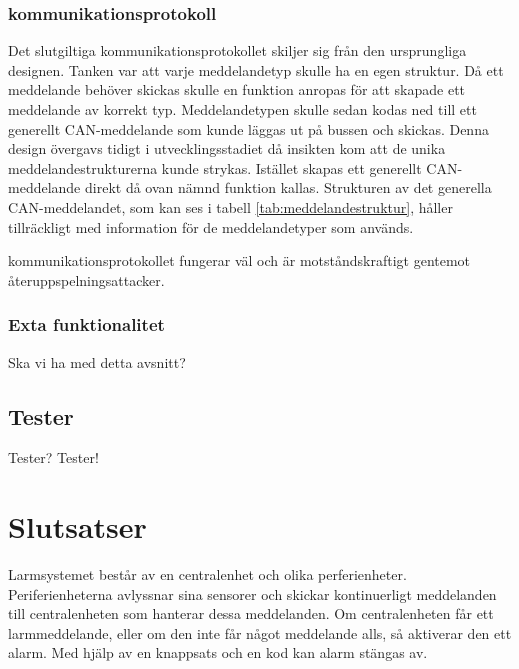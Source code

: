 \documentclass[a4paper]{article}
\begin{document}
\subsubsection{kommunikationsprotokoll}
Det slutgiltiga kommunikationsprotokollet skiljer sig från den ursprungliga designen.
Tanken var att varje meddelandetyp skulle ha en egen struktur.
Då ett meddelande behöver skickas skulle en funktion anropas för att skapade ett meddelande av korrekt typ.
Meddelandetypen skulle sedan kodas ned till ett generellt CAN-meddelande som kunde läggas ut på bussen och skickas.
Denna design övergavs tidigt i utvecklingsstadiet då insikten kom att de unika meddelandestrukturerna kunde strykas.
Istället skapas ett generellt CAN-meddelande direkt då ovan nämnd funktion kallas.
Strukturen av det generella CAN-meddelandet, som kan ses i tabell \ref{tab:meddelandestruktur}, håller tillräckligt med information för de meddelandetyper som används.

kommunikationsprotokollet fungerar väl och är motståndskraftigt gentemot återuppspelningsattacker.


\subsubsection{Exta funktionalitet}
Ska vi ha med detta avsnitt?

\subsection{Tester}
Tester? Tester!


\section{Slutsatser}

Larmsystemet består av en centralenhet och olika perferienheter. 
Periferienheterna avlyssnar sina sensorer och skickar kontinuerligt meddelanden till centralenheten som hanterar dessa meddelanden. 
Om centralenheten får ett larmmeddelande, eller om den inte får något meddelande alls, så aktiverar den ett alarm. 
Med hjälp av en knappsats och en kod kan alarm stängas av.
\end{document}
